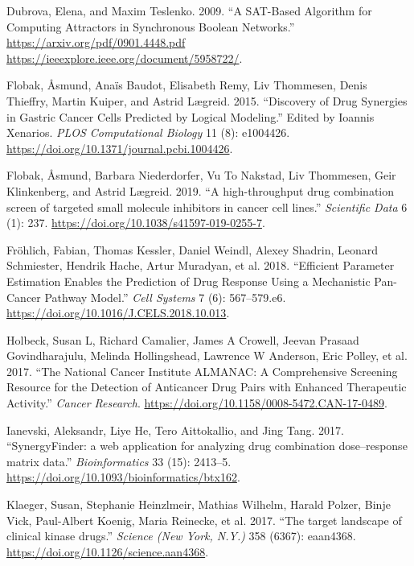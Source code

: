 \documentclass[
  12pt,
]{book}
\begin{document}
\leavevmode\hypertarget{ref-Dubrova2009}{}%
Dubrova, Elena, and Maxim Teslenko. 2009. ``A SAT-Based Algorithm for Computing Attractors in Synchronous Boolean Networks.'' \href{https://arxiv.org/pdf/0901.4448.pdf\%20https://ieeexplore.ieee.org/document/5958722/}{https://arxiv.org/pdf/0901.4448.pdf https://ieeexplore.ieee.org/document/5958722/}.

\leavevmode\hypertarget{ref-Flobak2015}{}%
Flobak, Åsmund, Anaïs Baudot, Elisabeth Remy, Liv Thommesen, Denis Thieffry, Martin Kuiper, and Astrid Lægreid. 2015. ``Discovery of Drug Synergies in Gastric Cancer Cells Predicted by Logical Modeling.'' Edited by Ioannis Xenarios. \emph{PLOS Computational Biology} 11 (8): e1004426. \url{https://doi.org/10.1371/journal.pcbi.1004426}.

\leavevmode\hypertarget{ref-Flobak2019}{}%
Flobak, Åsmund, Barbara Niederdorfer, Vu To Nakstad, Liv Thommesen, Geir Klinkenberg, and Astrid Lægreid. 2019. ``A high-throughput drug combination screen of targeted small molecule inhibitors in cancer cell lines.'' \emph{Scientific Data} 6 (1): 237. \url{https://doi.org/10.1038/s41597-019-0255-7}.

\leavevmode\hypertarget{ref-Frohlich2018}{}%
Fröhlich, Fabian, Thomas Kessler, Daniel Weindl, Alexey Shadrin, Leonard Schmiester, Hendrik Hache, Artur Muradyan, et al. 2018. ``Efficient Parameter Estimation Enables the Prediction of Drug Response Using a Mechanistic Pan-Cancer Pathway Model.'' \emph{Cell Systems} 7 (6): 567--579.e6. \url{https://doi.org/10.1016/J.CELS.2018.10.013}.

\leavevmode\hypertarget{ref-Holbeck2017}{}%
Holbeck, Susan L, Richard Camalier, James A Crowell, Jeevan Prasaad Govindharajulu, Melinda Hollingshead, Lawrence W Anderson, Eric Polley, et al. 2017. ``The National Cancer Institute ALMANAC: A Comprehensive Screening Resource for the Detection of Anticancer Drug Pairs with Enhanced Therapeutic Activity.'' \emph{Cancer Research}. \url{https://doi.org/10.1158/0008-5472.CAN-17-0489}.

\leavevmode\hypertarget{ref-Ianevski2017}{}%
Ianevski, Aleksandr, Liye He, Tero Aittokallio, and Jing Tang. 2017. ``SynergyFinder: a web application for analyzing drug combination dose--response matrix data.'' \emph{Bioinformatics} 33 (15): 2413--5. \url{https://doi.org/10.1093/bioinformatics/btx162}.

\leavevmode\hypertarget{ref-Klaeger2017}{}%
Klaeger, Susan, Stephanie Heinzlmeir, Mathias Wilhelm, Harald Polzer, Binje Vick, Paul-Albert Koenig, Maria Reinecke, et al. 2017. ``The target landscape of clinical kinase drugs.'' \emph{Science (New York, N.Y.)} 358 (6367): eaan4368. \url{https://doi.org/10.1126/science.aan4368}.
\end{document}
